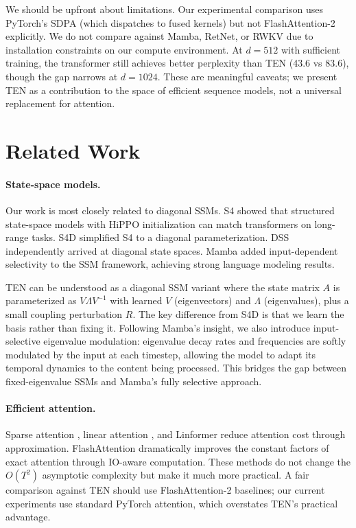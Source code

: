 \documentclass{article}
\begin{document}
We should be upfront about limitations. Our experimental comparison uses PyTorch's SDPA (which dispatches to fused kernels) but not FlashAttention-2 explicitly. We do not compare against Mamba, RetNet, or RWKV due to installation constraints on our compute environment. At $d = 512$ with sufficient training, the transformer still achieves better perplexity than TEN (43.6 vs 83.6), though the gap narrows at $d = 1024$. These are meaningful caveats; we present TEN as a contribution to the space of efficient sequence models, not a universal replacement for attention.


\section{Related Work}

\paragraph{State-space models.}
Our work is most closely related to diagonal SSMs. S4 \cite{gu2021efficiently} showed that structured state-space models with HiPPO initialization can match transformers on long-range tasks. S4D \cite{gu2022parameterization} simplified S4 to a diagonal parameterization. DSS \cite{gupta2022diagonal} independently arrived at diagonal state spaces. Mamba \cite{gu2023mamba} added input-dependent selectivity to the SSM framework, achieving strong language modeling results.

TEN can be understood as a diagonal SSM variant where the state matrix $A$ is parameterized as $V\Lambda V^{-1}$ with learned $V$ (eigenvectors) and $\Lambda$ (eigenvalues), plus a small coupling perturbation $R$. The key difference from S4D is that we learn the basis rather than fixing it. Following Mamba's insight, we also introduce input-selective eigenvalue modulation: eigenvalue decay rates and frequencies are softly modulated by the input at each timestep, allowing the model to adapt its temporal dynamics to the content being processed. This bridges the gap between fixed-eigenvalue SSMs and Mamba's fully selective approach.

\paragraph{Efficient attention.}
Sparse attention \cite{child2019generating, beltagy2020longformer}, linear attention \cite{katharopoulos2020transformers, choromanski2021rethinking}, and Linformer \cite{wang2020linformer} reduce attention cost through approximation. FlashAttention \cite{dao2022flashattention} dramatically improves the constant factors of exact attention through IO-aware computation. These methods do not change the $O(T^2)$ asymptotic complexity but make it much more practical. A fair comparison against TEN should use FlashAttention-2 baselines; our current experiments use standard PyTorch attention, which overstates TEN's practical advantage.
\end{document}
